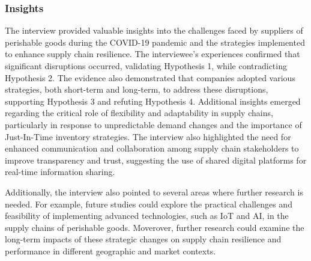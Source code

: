 \subsubsection{Insights}

The interview provided valuable insights into the challenges faced by suppliers of perishable goods during the COVID-19 pandemic and the strategies implemented to enhance supply chain resilience. The interviewee's experiences confirmed that significant disruptions occurred, validating Hypothesis 1, while contradicting Hypothesis 2. The evidence also demonstrated that companies adopted various strategies, both short-term and long-term, to address these disruptions, supporting Hypothesis 3 and refuting Hypothesis 4. Additional insights emerged regarding the critical role of flexibility and adaptability in supply chains, particularly in response to unpredictable demand changes and the importance of Just-In-Time inventory strategies. The interview also highlighted the need for enhanced communication and collaboration among supply chain stakeholders to improve transparency and trust, suggesting the use of shared digital platforms for real-time information sharing.

Additionally, the interview also pointed to several areas where further research is needed. For example, future studies could explore the practical challenges and feasibility of implementing advanced technologies, such as IoT and AI, in the supply chains of perishable goods. Moverover, further research could examine the long-term impacts of these strategic changes on supply chain resilience and performance in different geographic and market contexts.


